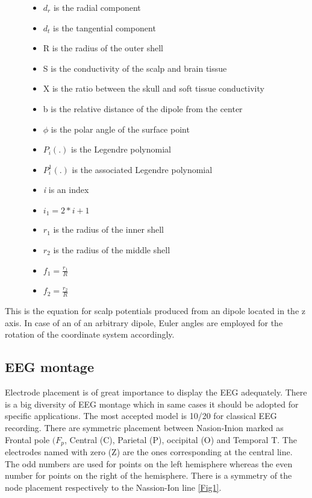 \begin{figure}[!htbp]
%
    \centering
\begin{itemize}
    \item $d_{r}$ is the radial component
    \item $d_{t}$ is the tangential component 
    \item R is the radius of the outer shell
    \item S is the conductivity of the scalp and brain tissue
    \item X is the ratio between the skull and soft tissue conductivity 
    \item b is the relative distance of the dipole from the center
    \item $\phi$ is the polar angle of the surface point    
\end{itemize}
\endminipage\hfill
{}%
    \centering    
\begin{itemize}
     \item $P_{i}(.)$ is the Legendre polynomial
    \item $P^{1}_{i}(.)$ is the associated Legendre polynomial
    \item \textit{i} is an index
    \item $i_{1}=2*i+1$
    \item $r_{1}$ is the radius of the inner shell
    \item $r_{2}$ is the radius of the middle shell
    \item $f_{1}=\frac{r_{1}}{R}$ 
    \item $f_{2}=\frac{r_{2}}{R}$    
\end{itemize}
\endminipage\hfill
\end{figure}


This is the equation for scalp potentials produced from an dipole located in the z axis. In case of an of an arbitrary dipole, Euler angles are employed for the rotation of the coordinate system accordingly. 

\subsection{EEG montage}

Electrode placement is of great importance to display the EEG adequately. There is a big diversity of EEG montage which in same cases it should be adopted for specific applications. The most accepted model is 10/20 for classical EEG recording. There are symmetric placement between Nasion-Inion marked as Frontal pole $(F_{p}$, Central (C), Parietal (P), occipital (O) and Temporal T. The electrodes named with zero (Z) are the ones corresponding at the central line. The odd numbers are used for points on the left hemisphere whereas the even number for points on the right of the hemisphere. There is a symmetry of the node placement respectively to the Nassion-Ion line \ref{Fig1}. 

